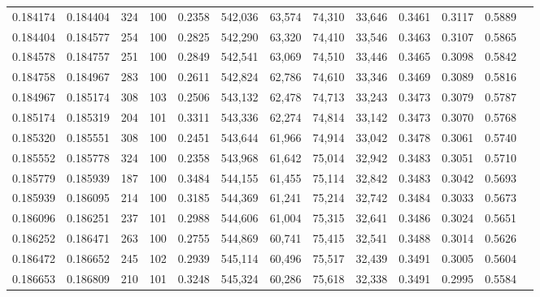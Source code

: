 \begin{tabular}{rrrrrrrrrrrrr}
0.184174 & 0.184404 &   324 & 100 &                                     0.2358 & 542,036 &  63,574 &  74,310 &  33,646 & 0.3461 & 0.3117 & 0.5889 \\
0.184404 & 0.184577 &   254 & 100 &                                     0.2825 & 542,290 &  63,320 &  74,410 &  33,546 & 0.3463 & 0.3107 & 0.5865 \\
0.184578 & 0.184757 &   251 & 100 &                                     0.2849 & 542,541 &  63,069 &  74,510 &  33,446 & 0.3465 & 0.3098 & 0.5842 \\
0.184758 & 0.184967 &   283 & 100 &                                     0.2611 & 542,824 &  62,786 &  74,610 &  33,346 & 0.3469 & 0.3089 & 0.5816 \\
0.184967 & 0.185174 &   308 & 103 &                                     0.2506 & 543,132 &  62,478 &  74,713 &  33,243 & 0.3473 & 0.3079 & 0.5787 \\
0.185174 & 0.185319 &   204 & 101 &                                     0.3311 & 543,336 &  62,274 &  74,814 &  33,142 & 0.3473 & 0.3070 & 0.5768 \\
0.185320 & 0.185551 &   308 & 100 &                                     0.2451 & 543,644 &  61,966 &  74,914 &  33,042 & 0.3478 & 0.3061 & 0.5740 \\
0.185552 & 0.185778 &   324 & 100 &                                     0.2358 & 543,968 &  61,642 &  75,014 &  32,942 & 0.3483 & 0.3051 & 0.5710 \\
0.185779 & 0.185939 &   187 & 100 &                                     0.3484 & 544,155 &  61,455 &  75,114 &  32,842 & 0.3483 & 0.3042 & 0.5693 \\
0.185939 & 0.186095 &   214 & 100 &                                     0.3185 & 544,369 &  61,241 &  75,214 &  32,742 & 0.3484 & 0.3033 & 0.5673 \\
0.186096 & 0.186251 &   237 & 101 &                                     0.2988 & 544,606 &  61,004 &  75,315 &  32,641 & 0.3486 & 0.3024 & 0.5651 \\
0.186252 & 0.186471 &   263 & 100 &                                     0.2755 & 544,869 &  60,741 &  75,415 &  32,541 & 0.3488 & 0.3014 & 0.5626 \\
0.186472 & 0.186652 &   245 & 102 &                                     0.2939 & 545,114 &  60,496 &  75,517 &  32,439 & 0.3491 & 0.3005 & 0.5604 \\
0.186653 & 0.186809 &   210 & 101 &                                     0.3248 & 545,324 &  60,286 &  75,618 &  32,338 & 0.3491 & 0.2995 & 0.5584 \\

\end{tabular}

